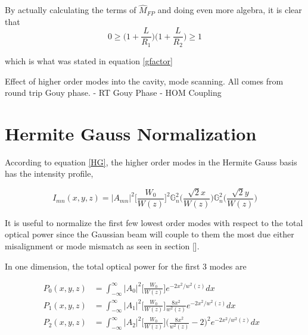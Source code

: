 \documentclass[oneside]{book}
\begin{document}
\begin{appendices}
	By actually calculating the terms of $\hat{M}_{FP}$ and doing even more algebra, it is clear that 
	\begin{equation}
	0 \geq \bigg(1+\frac{L}{R_1}\bigg) \bigg(1+\frac{L}{R_2}\bigg) \geq 1
	\end{equation}
	
	which is what was stated in equation \ref{gfactor}
	
	Effect of higher order modes into the cavity, mode scanning. All comes from round trip Gouy phase.
	- RT Gouy Phase
	- HOM Coupling
	
	\chapter{Hermite Gauss Normalization}
	According to equation \ref{HG}, the higher order modes in the Hermite Gauss basis has the intensity profile,
	
	\begin{equation}
		I_{mn} (x,y,z) = \vert A_{mn} \vert^2 \bigg[ \frac{W_0}{W(z)} \bigg]^2  \mathbb{G}^2_n\Bigg( \frac{\sqrt{2}x}{W(z)} \Bigg) \mathbb{G}^2_n\Bigg( \frac{\sqrt{2}y}{W(z)} \Bigg)
	\end{equation}

	It is useful to normalize the first few lowest order modes with respect to the total optical power since the Gaussian beam will couple to them the most due either misalignment or mode mismatch as seen in section [].
	
	In one dimension, the total optical power for the first 3 modes are
	
	\begin{equation}
	\label{HGNormalInt1D}
	\begin{aligned}
		P_{0}(x,y,z) 	& 	=	\int_{-\infty}^{\infty}  \vert A_{0} \vert^2   \bigg[ \frac{W_0}{W(z)} \bigg] e^{-2x^2/w^2(z)} dx	&
	\\	P_{1}(x,y,z)	&	=	\int_{-\infty}^{\infty}  \vert A_{1} \vert^2  \bigg[ \frac{W_0}{W(z)} \bigg] \frac{8x^2}{w^2(z)} 	
								e^{-2x^2/w^2(z)}dx &
	\\	P_{2}(x,y,z)	&	= 	\int_{-\infty}^{\infty}  \vert A_{2} \vert^2   \bigg[ \frac{W_0}{W(z)} \bigg] \bigg(\frac{8x^2}{w^2(z)}	-2\bigg)^2e^{-2x^2/w^2(z)}dx
	\end{aligned}
	\end{equation}
	

\end{appendices}
\end{document}
